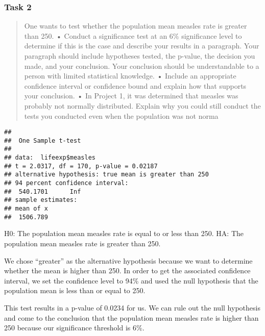 \documentclass[
]{article}
\newenvironment{Shaded}{\begin{snugshade}}{\end{snugshade}}
\newcommand{\AttributeTok}[1]{\textcolor[rgb]{0.77,0.63,0.00}{#1}}
\newcommand{\DecValTok}[1]{\textcolor[rgb]{0.00,0.00,0.81}{#1}}
\newcommand{\FloatTok}[1]{\textcolor[rgb]{0.00,0.00,0.81}{#1}}
\newcommand{\FunctionTok}[1]{\textcolor[rgb]{0.00,0.00,0.00}{#1}}
\newcommand{\NormalTok}[1]{#1}
\newcommand{\SpecialCharTok}[1]{\textcolor[rgb]{0.00,0.00,0.00}{#1}}
\newcommand{\StringTok}[1]{\textcolor[rgb]{0.31,0.60,0.02}{#1}}
\begin{document}
\hypertarget{task-2}{%
\subsubsection{Task 2}\label{task-2}}

\begin{quote}
One wants to test whether the population mean measles rate is greater
than 250. • Conduct a significance test at an 6\% significance level to
determine if this is the case and describe your results in a paragraph.
Your paragraph should include hypotheses tested, the p-value, the
decision you made, and your conclusion. Your conclusion should be
understandable to a person with limited statistical knowledge. • Include
an appropriate confidence interval or confidence bound and explain how
that supports your conclusion. • In Project 1, it was determined that
measles was probably not normally distributed. Explain why you could
still conduct the tests you conducted even when the population was not
norma
\end{quote}

\begin{Shaded}
\end{Shaded}

\begin{verbatim}
## 
##  One Sample t-test
## 
## data:  lifeexp$measles
## t = 2.0317, df = 170, p-value = 0.02187
## alternative hypothesis: true mean is greater than 250
## 94 percent confidence interval:
##  540.1701      Inf
## sample estimates:
## mean of x 
##  1506.789
\end{verbatim}

H0: The population mean measles rate is equal to or less than 250. HA:
The population mean measles rate is greater than 250.

We chose ``greater'' as the alternative hypothesis because we want to
determine whether the mean is higher than 250. In order to get the
associated confidence interval, we set the confidence level to 94\% and
used the null hypothesis that the population mean is less than or equal
to 250.

This test results in a p-value of 0.0234 for us. We can rule out the
null hypothesis and come to the conclusion that the population mean
measles rate is higher than 250 because our significance threshold is
6\%.
\end{document}
